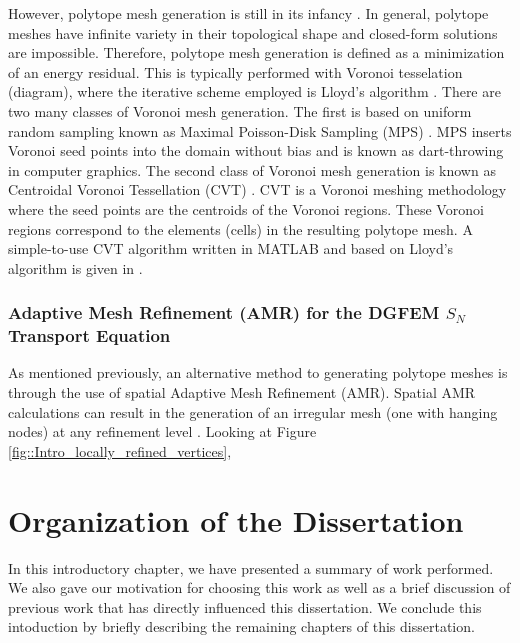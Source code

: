 However, polytope mesh generation is still in its infancy \cite{yip2005automated,sieger2010optimizing,ebeida2011uniform}. In general, polytope meshes have infinite variety in their topological shape and closed-form solutions are impossible. Therefore, polytope mesh generation is defined as a minimization of an energy residual. This is typically performed with Voronoi tesselation (diagram), where the iterative scheme employed is Lloyd's algorithm \cite{lloyd1982least,linde1980algorithm}. There are two many classes of Voronoi mesh generation. The first is based on uniform random sampling known as Maximal Poisson-Disk Sampling (MPS) \cite{ebeida2011uniform,ebeida2011efficient,ebeida2012simple}. MPS inserts Voronoi seed points into the domain without bias and is known as dart-throwing in computer graphics. The second class of Voronoi mesh generation is known as Centroidal Voronoi Tessellation (CVT) \cite{du1999centroidal,valette2004approximated}. CVT is a Voronoi meshing methodology where the seed points are the centroids of the Voronoi regions. These Voronoi regions correspond to the elements (cells) in the resulting polytope mesh. A simple-to-use CVT algorithm written in MATLAB and based on Lloyd's algorithm is given in \cite{talischi2012polymesher}.

\subsubsection{Adaptive Mesh Refinement (AMR) for the DGFEM $S_N$ Transport Equation}
\label{sec::Intro_Past_Polytopes_AMR}

As mentioned previously, an alternative method to generating polytope meshes is through the use of spatial Adaptive Mesh Refinement (AMR). Spatial AMR calculations can result in the generation of an irregular mesh (one with hanging nodes) at any refinement level \cite{plewa2005adaptive}. Looking at Figure \ref{fig::Intro_locally_refined_vertices}, 

\section{Organization of the Dissertation}
\label{sec::Intro_Organization}

In this introductory chapter, we have presented a summary of work performed. We also gave our motivation for choosing this work as well as a brief discussion of previous work that has directly influenced this dissertation. We conclude this intoduction by briefly describing the remaining chapters of this dissertation.

